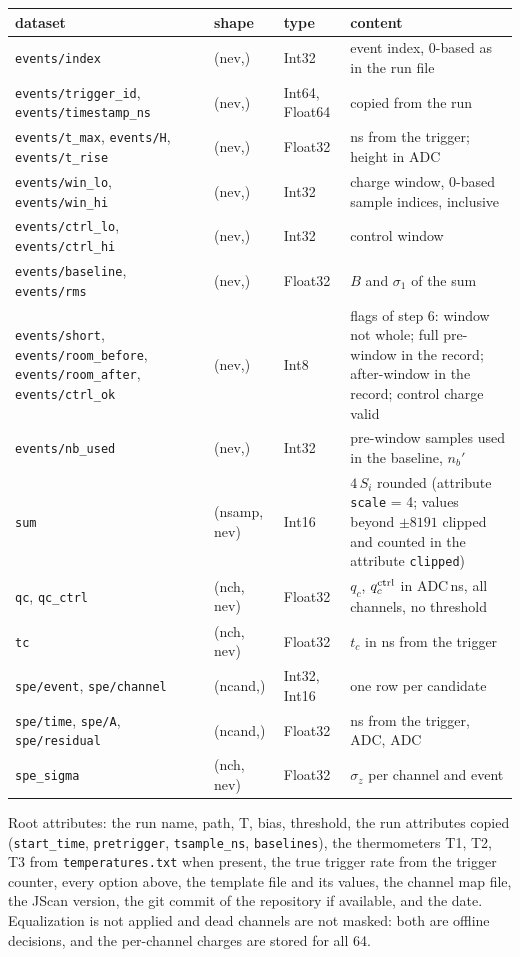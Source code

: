 \documentclass[11pt]{article}
\newcommand{\code}[1]{\texttt{#1}}
\begin{document}
\begin{center}
\begin{tabular}{l l l p{62mm}}
\toprule
dataset & shape & type & content \\
\midrule
\code{events/index} & (nev,) & Int32 & event index, 0-based as in the run file \\
\code{events/trigger\_id}, \code{events/timestamp\_ns} & (nev,) & Int64, Float64 & copied from the run \\
\code{events/t\_max}, \code{events/H}, \code{events/t\_rise} & (nev,) & Float32 & ns from the trigger; height in ADC \\
\code{events/win\_lo}, \code{events/win\_hi} & (nev,) & Int32 & charge window, 0-based sample indices, inclusive \\
\code{events/ctrl\_lo}, \code{events/ctrl\_hi} & (nev,) & Int32 & control window \\
\code{events/baseline}, \code{events/rms} & (nev,) & Float32 & $B$ and $\sigma_1$ of the sum \\
\code{events/short}, \code{events/room\_before}, \code{events/room\_after}, \code{events/ctrl\_ok} & (nev,) & Int8 & flags of step 6: window not whole; full pre-window in the record; after-window in the record; control charge valid \\
\code{events/nb\_used} & (nev,) & Int32 & pre-window samples used in the baseline, $n_b'$ \\
\code{sum} & (nsamp, nev) & Int16 & $4\,S_i$ rounded (attribute \code{scale} = 4; values beyond $\pm 8191$ clipped and counted in the attribute \code{clipped}) \\
\code{qc}, \code{qc\_ctrl} & (nch, nev) & Float32 & $q_c$, $q_c^{\rm ctrl}$ in ADC\,ns, all channels, no threshold \\
\code{tc} & (nch, nev) & Float32 & $t_c$ in ns from the trigger \\
\code{spe/event}, \code{spe/channel} & (ncand,) & Int32, Int16 & one row per candidate \\
\code{spe/time}, \code{spe/A}, \code{spe/residual} & (ncand,) & Float32 & ns from the trigger, ADC, ADC \\
\code{spe\_sigma} & (nch, nev) & Float32 & $\sigma_z$ per channel and event \\
\bottomrule
\end{tabular}
\end{center}

Root attributes: the run name, path, T, bias, threshold, the run
attributes copied (\code{start\_time}, \code{pretrigger}, \code{tsample\_ns},
\code{baselines}), the thermometers T1, T2, T3 from \code{temperatures.txt}
when present, the true trigger rate from the trigger counter, every option
above, the template file and its values, the channel map file, the JScan
version, the git commit of the repository if available, and the date.
Equalization is not applied and dead channels are not masked: both are
offline decisions, and the per-channel charges are stored for all 64.
\end{document}
